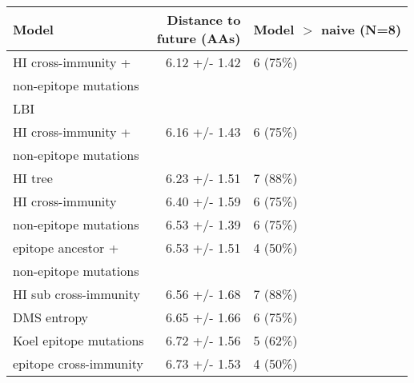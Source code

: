 \begin{tabular*}{0.7\textwidth}{lrl}
\toprule
                             Model & \makecell{Distance to \\ future (AAs)} & \makecell[l]{Model $>$ naive \\ (N=8)} \\
\midrule
               HI cross-immunity + &                          6.12 +/- 1.42 &                               6 (75\%) \\
 \hspace{3mm}non-epitope mutations &                                        &                                        \\
                   \hspace{3mm}LBI &                                        &                                        \\
               HI cross-immunity + &                          6.16 +/- 1.43 &                               6 (75\%) \\
 \hspace{3mm}non-epitope mutations &                                        &                                        \\
                           HI tree &                          6.23 +/- 1.51 &                               7 (88\%) \\
                 HI cross-immunity &                          6.40 +/- 1.59 &                               6 (75\%) \\
             non-epitope mutations &                          6.53 +/- 1.39 &                               6 (75\%) \\
                epitope ancestor + &                          6.53 +/- 1.51 &                               4 (50\%) \\
 \hspace{3mm}non-epitope mutations &                                        &                                        \\
             HI sub cross-immunity &                          6.56 +/- 1.68 &                               7 (88\%) \\
                       DMS entropy &                          6.65 +/- 1.66 &                               6 (75\%) \\
            Koel epitope mutations &                          6.72 +/- 1.56 &                               5 (62\%) \\
            epitope cross-immunity &                          6.73 +/- 1.53 &                               4 (50\%) \\

\end{tabular*}
